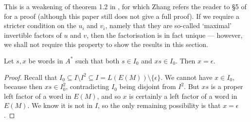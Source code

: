 \documentclass[noindex,noinsetproof,12pt]{lmaths}
\begin{document}
This is a weakening of theorem 1.2 in \cite{Zhang1992}, for which Zhang refers the reader to \S5 of \cite{Otto1991} for a proof (although this paper still does not give a full proof). If we require a stricter condition on the $u_i$ and $v_i$, namely that they are so-called `maximal' invertible factors of $u$ and $v$, then the factorisation is in fact unique --- however, we shall not require this property to show the results in this section.

\begin{lemma}
	Let $s, x$ be words in $A^*$ such that both $s \in I_0$ and $xs \in I_0$. Then $x = \epsilon$. \label{lma:I0-suffix-code}
\end{lemma}
\begin{proof}
	Recall that $I_0 \subseteq I \setminus I^2 \subseteq I = L(E(M)) \setminus \{\epsilon\}$. We cannot have $x \in I_0$, because then $xs \in I_0^2$, contradicting $I_0$ being disjoint from $I^2$. But $xs$ is a proper left factor of a word in $E(M)$, and so $x$ is certainly a left factor of a word in $E(M)$. We know it is not in $I$, so the only remaining possibility is that $x = \epsilon$.
\end{proof}
\end{document}
